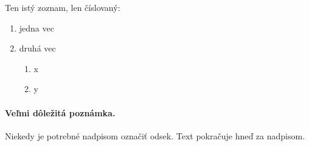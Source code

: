 \documentclass[10pt,twoside,english,a4paper]{article}
\begin{document}
Ten istý zoznam, len číslovaný:

\begin{enumerate}
\item jedna vec
\item druhá vec
	\begin{enumerate}
	\item x
	\item y
	\end{enumerate}
\end{enumerate}


\paragraph{Veľmi dôležitá poznámka.}
Niekedy je potrebné nadpisom označiť odsek. Text pokračuje hneď za nadpisom.



\end{document}
